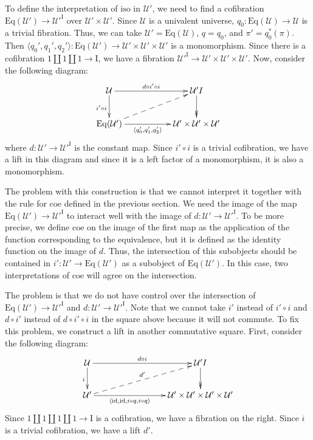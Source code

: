 \documentclass{amsart}
\theoremstyle{definition}
\theoremstyle{remark}
\newcommand{\fs}[1]{\mathrm{#1}}
\newcommand{\I}{\fs{I}}
\newcommand{\coe}{\fs{coe}}
\newcommand{\iso}{\fs{iso}}
\newcommand{\id}{\fs{id}}
\newcommand{\U}{\mathcal{U}}
\newcommand{\Eq}{\fs{Eq}}
\numberwithin{figure}{section}
\begin{document}
To define the interpretation of $\iso$ in $\U'$, we need to find a cofibration $\Eq(\U') \to \U'^\I$ over $\U' \times \U'$.
Since $\U$ is a univalent universe, $q_0 : \Eq(\U) \to \U$ is a trivial fibration.
Thus, we can take $\U' = \Eq(\U)$, $q = q_0$, and $\pi' = q_0^*(\pi)$.
Then $\langle q_0', q_1', q_2' \rangle : \Eq(\U') \to \U' \times \U' \times \U'$ is a monomorphism.
Since there is a cofibration $1 \amalg 1 \amalg 1 \to \I$, we have a fibration $\U'^\I \to \U' \times \U' \times \U'$.
Now, consider the following diagram:
\[ \xymatrix{ \U \ar[rr]^-{d \circ i' \circ i} \ar[d]_{i' \circ i}                  & & \U'^\I \ar@{->>}[d] \\
              \Eq(\U') \ar[rr]_-{\langle q_0', q_1', q_2' \rangle} \ar@{-->}[urr]   & & \U' \times \U' \times \U'
            } \]
where $d : \U' \to \U'^\I$ is the constant map.
Since $i' \circ i$ is a trivial cofibration, we have a lift in this diagram and since it is a left factor of a monomorphism, it is also a monomorphism.

The problem with this construction is that we cannot interpret it together with the rule for $\coe$ defined in the previous section.
We need the image of the map $\Eq(\U') \to \U'^\I$ to interact well with the image of $d : \U' \to \U'^\I$.
To be more precise, we define $\coe$ on the image of the first map as the application of the function corresponding to the equivalence, but it is defined as the identity function on the image of $d$.
Thus, the intersection of this subobjects should be contained in $i' : \U' \to \Eq(\U')$ as a subobject of $\Eq(\U')$.
In this case, two interpretations of $\coe$ will agree on the intersection.

The problem is that we do not have control over the intersection of $\Eq(\U') \to \U'^\I$ and $d : \U' \to \U'^\I$.
Note that we cannot take $i'$ instead of $i' \circ i$ and $d \circ i'$ instead of $d \circ i' \circ i$ in the square above because it will not commute.
To fix this problem, we construct a lift in another commutative square.
First, consider the following diagram:
\[ \xymatrix{ \U \ar[rrr]^-{d \circ i} \ar[d]_{i}                                                   & & & \U'^\I \ar@{->>}[d] \\
              \U' \ar[rrr]_-{\langle \id, \id, i \circ q, i \circ q \rangle} \ar@{-->}[urrr]^{d'}   & & & \U' \times \U' \times \U' \times \U'
            } \]
Since $1 \amalg 1 \amalg 1 \amalg 1 \to \I$ is a cofibration, we have a fibration on the right.
Since $i$ is a trivial cofibration, we have a lift $d'$.
\end{document}
